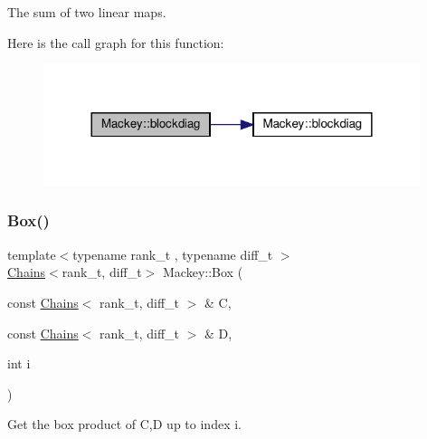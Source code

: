 The sum of two linear maps. 

Here is the call graph for this function\+:\nopagebreak
\begin{figure}[H]
\begin{center}
\leavevmode
\includegraphics[width=312pt]{namespaceMackey_a64d299f4b6f36e4b4e873b56a44b14b0_cgraph}
\end{center}
\end{figure}
\mbox{\label{namespaceMackey_add5b60c8e734df2be261106e0c719f82}} 
\subsubsection{\texorpdfstring{Box()}{Box()}\hspace{0.1cm}{\footnotesize\ttfamily [1/2]}}
{\footnotesize\ttfamily template$<$typename rank\+\_\+t , typename diff\+\_\+t $>$ \\
\hyperlink{classMackey_1_1Chains}{Chains}$<$rank\+\_\+t, diff\+\_\+t$>$ Mackey\+::\+Box (\begin{DoxyParamCaption}\item[{const \hyperlink{classMackey_1_1Chains}{Chains}$<$ rank\+\_\+t, diff\+\_\+t $>$ \&}]{C,  }\item[{const \hyperlink{classMackey_1_1Chains}{Chains}$<$ rank\+\_\+t, diff\+\_\+t $>$ \&}]{D,  }\item[{int}]{i }\end{DoxyParamCaption})\hspace{0.3cm}{\ttfamily [inline]}}



Get the box product of C,D up to index i. 

\mbox{\label{namespaceMackey_a72abbe3708c4e77936c8cc42fbc6753a}} 
